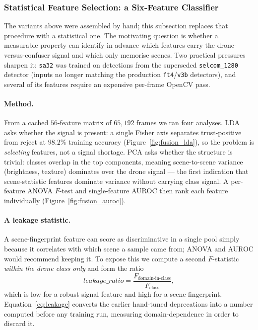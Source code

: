 \subsubsection{Statistical Feature Selection: a Six-Feature Classifier}
\label{sec:feature_selection}

The variants above were assembled by hand; this subsection replaces that procedure with a statistical one. The motivating question is whether a measurable property can identify in advance which features carry the drone-versus-confuser signal and which only memorise scenes. Two practical pressures sharpen it: \texttt{sa32} was trained on detections from the superseded \texttt{selcom\_1280} detector (inputs no longer matching the production \texttt{ft4}/\texttt{v3b} detectors), and several of its features require an expensive per-frame OpenCV pass.

\paragraph{Method.}
From a cached $56$-feature matrix of $65{,}192$ frames we ran four analyses. LDA asks whether the signal is present: a single Fisher axis separates trust-positive from reject at $98.2\%$ training accuracy (Figure~\ref{fig:fusion_lda}), so the problem is \emph{selecting} features, not a signal shortage. PCA asks whether the structure is trivial: classes overlap in the top components, meaning scene-to-scene variance (brightness, texture) dominates over the drone signal --- the first indication that scene-statistic features dominate variance without carrying class signal. A per-feature ANOVA $F$-test and single-feature AUROC then rank each feature individually (Figure~\ref{fig:fusion_auroc}).

\paragraph{A leakage statistic.}
A scene-fingerprint feature can score as discriminative in a single pool simply because it correlates with which scene a sample came from; ANOVA and AUROC would recommend keeping it. To expose this we compute a second $F$-statistic \emph{within the drone class only} and form the ratio
\begin{equation}
\mathit{leakage\_ratio} = \frac{F_\text{domain-in-class}}{F_\text{class}},
\label{eq:leakage}
\end{equation}
which is low for a robust signal feature and high for a scene fingerprint. Equation~\ref{eq:leakage} converts the earlier hand-tuned deprecations into a number computed before any training run, measuring domain-dependence in order to discard it.

